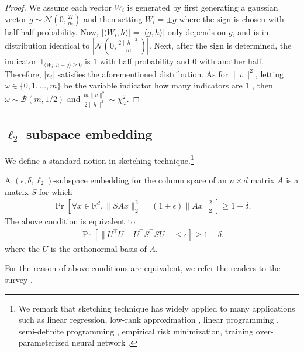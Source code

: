 \begin{proof}
    We assume each vector $W_i$ is generated by first generating a gaussian vector $g \sim \mathcal{N} (0, \frac{2   I}{m} )$ and then setting $ W_i=\pm g$ where the sign is chosen with half-half probability. Now, $ | \langle W_i, h \rangle |=|\langle g, h\rangle|$ only depends on $g$, and is in distribution identical to $ |\mathcal{N} (0, \frac{2\|h\|^2}{m} ) |$. Next, after the sign is determined, the indicator $\mathbf{1}_{ \langle W_i, h+q \rangle \geq 0}$ is $1$ with half probability and $0$ with another half. Therefore, $ |v_i |$ satisfies the aforementioned distribution. As for $\|v\|^2$, letting $\omega \in\{0,1, \ldots, m\}$ be the variable indicator how many indicators are $1$ , then $\omega \sim \mathcal{B}(m, 1 / 2)$ and $\frac{m\|v\|^2}{2\|h\|^2} \sim \chi_\omega^2$.
\end{proof}
 

\subsection{$\ell_2$ subspace embedding}\label{sec:l2_subspace}

We define a standard notion in sketching technique.\footnote{We remark that sketching technique has widely applied to many applications such as linear regression, low-rank approximation \cite{cw13,nn13,ldfu13,bwz16,c16,rsw16,swz17,swz19}, linear programming \cite{sy21,dly21,jswz21,gs22}, semi-definite programming \cite{gs22,syyz23}, empirical risk minimization\cite{lsz19,qszz23}, training over-parameterized neural network \cite{bpsw21,szz21,als+22,hswz22,z22}.}
\begin{definition}\label{def:l2_subspace_embedding}%
A $(\epsilon, \delta, \ell_2)$-subspace embedding for the column space of an $n \times d$ matrix $A$ is a matrix $S$ for which %
\begin{align*}
  \Pr [ \forall x \in \mathbb{R}^d,  \|S Ax\|_2^2 = (1 \pm \epsilon) \|Ax\|_2^2 ] \geq 1-\delta.
\end{align*}
The above condition is equivalent to
\begin{align*}
\Pr[ \| U^\top U - U^\top S^\top S U \| \leq \epsilon ] \geq 1-\delta.
\end{align*}
where the $U$ is the orthonormal basis of $A$.
\end{definition}
For the reason of above conditions are equivalent, we refer the readers to the survey \cite{w14}.

